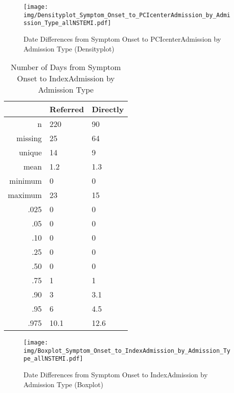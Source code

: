 \documentclass[presentation,xcolor=pdftex,dvipsnames,table,11pt]{beamer}
\begin{document}
\begin{tiny}
\begin{frame}
\begin{figure}
  \centering
  \caption{Date Differences from Symptom Onset to PCIcenterAdmission by Admission Type (Densityplot)}
  \label{Density: Date Differences from Symptom Onset to PCIcenterAdmission by Admission Type}
\texttt{[image: img/Densityplot\_Symptom\_Onset\_to\_PCIcenterAdmission\_by\_Admission\_Type\_allNSTEMI.pdf]}\end{figure}
\end{frame}




\begin{table}[ht]
\centering
\begin{tabular}{rll}
  \toprule
 & Referred & Directly \\ 
  \midrule
n & 220 & 90 \\ 
  missing & 25 & 64 \\ 
  unique & 14 & 9 \\ 
  mean & 1.2 & 1.3 \\ 
  minimum & 0 & 0 \\ 
  maximum & 23 & 15 \\ 
  .025 & 0 & 0 \\ 
  .05 & 0 & 0 \\ 
  .10 & 0 & 0 \\ 
  .25 & 0 & 0 \\ 
  .50 & 0 & 0 \\ 
  .75 & 1 & 1 \\ 
  .90 & 3 & 3.1 \\ 
  .95 & 6 & 4.5 \\ 
  .975 & 10.1 & 12.6 \\ 
   \bottomrule
\end{tabular}
\caption{Number of Days from Symptom Onset to IndexAdmission by Admission Type} 
\end{table}
\begin{frame}
\begin{figure}
  \centering
  \caption{Date Differences from Symptom Onset to IndexAdmission by Admission Type (Boxplot)}
  \label{Boxplot: Date Differences from Symptom Onset to IndexAdmission by Admission Type}
\texttt{[image: img/Boxplot\_Symptom\_Onset\_to\_IndexAdmission\_by\_Admission\_Type\_allNSTEMI.pdf]}\end{figure}
\end{frame}



\end{tiny}
\end{document}
